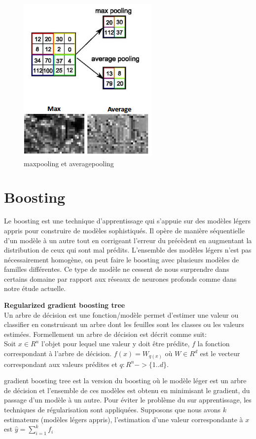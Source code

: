 \begin{figure}[H]
    \centering
    \includegraphics[scale = 0.5]{images/average_max.png}
    \caption{maxpooling et averagepooling}
\end{figure}


\section{Boosting}\label{section22}
Le boosting est une technique d'apprentissage qui s'appuie sur des modèles légers appris pour construire de modèles sophistiqués. Il opère de manière séquentielle d'un modèle à un autre tout en corrigeant l'erreur du précèdent en augmentant la distribution de ceux qui sont mal prédits. L'ensemble des modèles légers n'est pas nécessairement homogène, on peut faire le boosting avec plusieurs modèles de familles différentes. Ce type de modèle ne cessent de nous surprendre dans certains domaine par rapport aux réseaux de neurones profonds comme dans notre étude actuelle.

\textbf{Regularized gradient boosting tree}\\
Un arbre de décision est une fonction/modèle permet d'estimer une valeur ou classifier en construisant un arbre dont les feuilles sont les classes ou les valeurs estimées. Formellement un arbre de décision est décrit comme suit: \\ Soit $x \in R^n$ l'objet pour lequel une valeur y doit être prédite, $f$ la fonction correspondant à l'arbre de décision.
$f(x) = W_{q(x)}$ où $W \in R^d$  est le vecteur correspondant aux valeurs prédites et $q: R^n -> \{1..d\}$.

gradient boosting tree est la version du boosting où le modèle léger est un arbre de décision et l'ensemble de ces modèles est obtenu en minimisant le gradient, du passage d'un modèle à un autre. Pour éviter le problème du sur apprentissage, les techniques de régularisation sont appliquées. Supposons que nous avons $k$ estimateurs (modèles légers appris), l'estimation d'une valeur correspondante à $x$ est $\widehat{y} = \sum \limits_{i=1}^k f_i $ 


